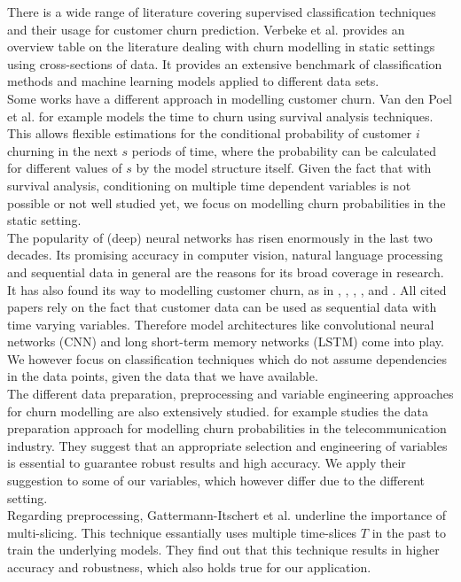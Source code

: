 \documentclass[12pt,titlepage]{article}
\begin{document}
There is a wide range of literature covering supervised classification techniques and their usage for customer churn prediction. Verbeke et al. \cite{verbekechurn} provides an overview table on the literature dealing with churn modelling in static settings using cross-sections of data. It provides an extensive benchmark of classification methods and machine learning models applied to different data sets. \\
Some works have a different approach in modelling customer churn. Van den Poel et al. \cite{vandenpoel} for example models the time to churn using survival analysis techniques. This allows flexible estimations for the conditional probability of customer $i$ churning in the next $s$ periods of time, where the probability can be calculated for different values of $s$ by the model structure itself. Given the fact that with survival analysis, conditioning on multiple time dependent variables is not possible or not well studied yet, we focus on modelling churn probabilities in the static setting. \\
The popularity of (deep) neural networks has risen enormously in the last two decades. Its promising accuracy in computer vision, natural language processing and sequential data in general are the reasons for its broad coverage in research. It has also found its way to modelling customer churn, as in \cite{martins}, \cite{tan2018}, \cite{wangperawong}, \cite{zaratiegui}, \cite{zhou} and \cite{mena}. All cited papers rely on the fact that customer data can be used as sequential data with time varying variables. Therefore model architectures like convolutional neural networks (CNN) and long short-term memory networks (LSTM) come into play. We however focus on classification techniques which do not assume dependencies in the data points, given the data that we have available. \\
The different data preparation, preprocessing and variable engineering approaches for churn modelling are also extensively studied. \cite{coussement} for example studies the data preparation approach for modelling churn probabilities in the telecommunication industry. They suggest that an appropriate selection and engineering of variables is essential to guarantee robust results and high accuracy. We apply their suggestion to some of our variables, which however differ due to the different setting. \\
Regarding preprocessing, Gattermann-Itschert et al. \cite{multiplets} underline the importance of multi-slicing. This technique essantially uses multiple time-slices $T$ in the past to train the underlying models. They find out that this technique results in higher accuracy and robustness, which also holds true for our application. \\
\end{document}

